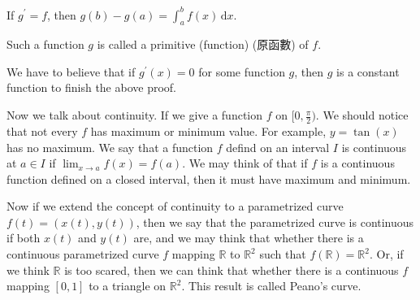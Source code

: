 \begin{theorem}
  If \(g^{\prime}  = f\), then \(g(b) - g(a) = \int _a^b f(x) \, \mathrm{d} x \).    
\end{theorem}

\begin{remark}
  Such a function \(g\) is called a primitive (function) (原函數) of \(f\).  
\end{remark}

\begin{remark}
  We have to believe that if \(g^{\prime} (x) = 0\) for some function \(g\), then \(g\) is a constant function to finish the above proof.   
\end{remark}

Now we talk about continuity. If we give a function \(f\) on \([0,\frac{\pi}{2})\). We should notice that not every \(f\) has maximum or minimum value. For example, \(y = \tan (x)\) has no maximum. We say that a function \(f\)  defind on an interval \(I\) is continuous at \(a \in I\) if \(\lim_{x \to a} f(x) = f(a) \). We may think of that if \(f\) is a continuous function defined on a closed interval, then it must have maximum and minimum.

Now if we extend the concept of continuity to a parametrized curve \(f(t)=(x(t),y(t))\), then we say that the parametrized curve is continuous if both \(x(t)\) and \(y(t)\) are, and we may think that whether there is a continuous parametrized curve \(f\)  mapping \(\mathbb{R}\) to \(\mathbb{R} ^2\) such that \(f(\mathbb{R} ) = \mathbb{R} ^2\).  Or, if we think \(\mathbb{R} \) is too scared, then we can think that whether there is a continuous \(f\) mapping \([0,1]\) to a triangle on \(\mathbb{R} ^2\). This result is called Peano's curve.           
